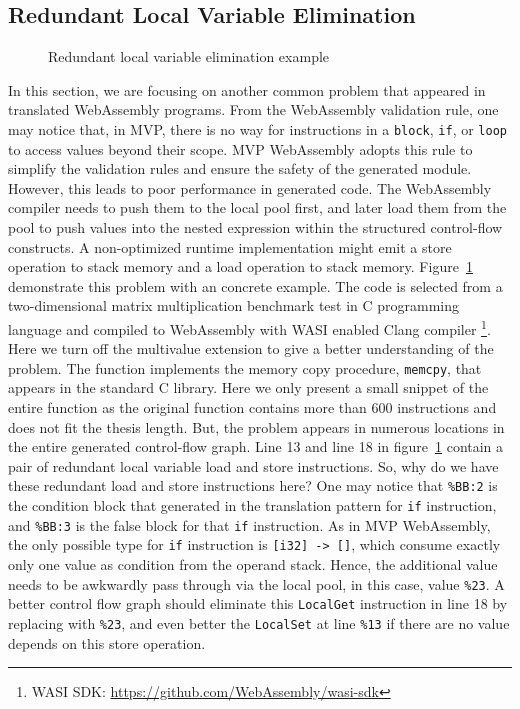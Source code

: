 \subsection{Redundant Local Variable Elimination}

\begin{figure}[ht]
    
    \caption{Redundant local variable elimination example}
    \label{fig:redundant-local-elem}
\end{figure}

In this section, we are focusing on another common problem that appeared in translated WebAssembly programs. From the WebAssembly validation rule, one may notice that, in MVP, there is no way for instructions in a \texttt{block}, \texttt{if}, or \texttt{loop} to access values beyond their scope. MVP WebAssembly adopts this rule to simplify the validation rules and ensure the safety of the generated module. However, this leads to poor performance in generated code. The WebAssembly compiler needs to push them to the local pool first, and later load them from the pool to push values into the nested expression within the structured control-flow constructs. A non-optimized runtime implementation might emit a store operation to stack memory and a load operation to stack memory. Figure~\ref{fig:redundant-local-elem} demonstrate this problem with an concrete example. The code is selected from a two-dimensional matrix multiplication benchmark test in C programming language and compiled to WebAssembly with WASI enabled Clang compiler \footnote{WASI SDK: \url{https://github.com/WebAssembly/wasi-sdk}}. Here we turn off the multivalue extension to give a better understanding of the problem. The function implements the memory copy procedure, \texttt{memcpy}, that appears in the standard C library. Here we only present a small snippet of the entire function as the original function contains more than 600 instructions and does not fit the thesis length. But, the problem appears in numerous locations in the entire generated control-flow graph. Line 13 and line 18 in figure~\ref{fig:redundant-local-elem} contain a pair of redundant local variable load and store instructions. So, why do we have these redundant load and store instructions here? One may notice that \texttt{\%BB:2} is the condition block that generated in the translation pattern for \texttt{if} instruction, and \texttt{\%BB:3} is the false block for that \texttt{if} instruction. As in MVP WebAssembly, the only possible type for \texttt{if} instruction is \texttt{[i32] -> []}, which consume exactly only one value as condition from the operand stack. Hence, the additional value needs to be awkwardly pass through via the local pool, in this case, value \texttt{\%23}. A better control flow graph should eliminate this \texttt{LocalGet} instruction in line 18 by replacing with \texttt{\%23}, and even better the \texttt{LocalSet} at line \texttt{\%13} if there are no value depends on this store operation.

